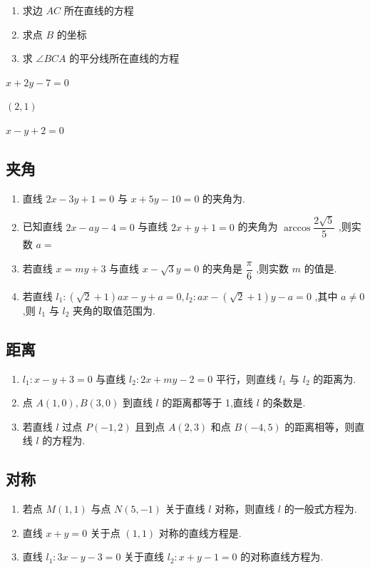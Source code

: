 \begin{enumerate}
\begin{enumerate}
        \item 求边 $AC$ 所在直线的方程
        \item 求点 $B$ 的坐标
        \item 求 $\angle BCA$ 的平分线所在直线的方程
    \end{enumerate}
    \begin{jieda}
        \begin{enumerate*}
            \item $x+2y-7 = 0$
            \item $(2,1)$
            \item $x-y+2=0$
        \end{enumerate*}
    \end{jieda}
\end{enumerate}
\subsection*{夹角}
\begin{enumerate}
    \item 直线 $2x - 3y + 1 = 0$ 与 $x + 5y - 10 = 0$ 的夹角为.
    \item 已知直线 $2x - ay - 4 = 0$ 与直线 $2x + y + 1 = 0$ 的夹角为 $\arccos \dfrac{2\sqrt{5}}{5}$ ,则实数 $a =$
    \item 若直线 $x = my + 3$ 与直线 $x - \sqrt{3}y = 0$ 的夹角是 $\dfrac{\pi}{6}$ ,则实数 $m$ 的值是.
    \item 若直线 $l_1 : \left( \sqrt{2} + 1\right) ax - y + a = 0,l_2 : ax - \left( \sqrt{2} + 1\right) y - a = 0$ ,其中 $a \neq 0$ ,则 $l_1$ 与 $l_2$ 夹角的取值范围为\blkda{$\left(0, \dfrac{\pi}{4}\right]$}.
\end{enumerate}
\subsection*{距离}
\begin{enumerate}
    \item $l_1 : x - y + 3 = 0$ 与直线 $l_2 : 2x + my - 2 = 0$ 平行，则直线 $l_1$ 与 $l_2$ 的距离为.
    \item 点 $A(1,0) ,B(3,0)$ 到直线 $l$ 的距离都等于 1,直线 $l$ 的条数是.
    \item 若直线 $l$ 过点 $P(-1,2)$ 且到点 $A(2,3)$ 和点 $B(-4,5)$ 的距离相等，则直线 $l$ 的方程为.
\end{enumerate}
\subsection*{对称}
\begin{enumerate}
    \item 若点 $M(1,1)$ 与点 $N(5, - 1)$ 关于直线 $l$ 对称，则直线 $l$ 的一般式方程为.
    \item 直线 $x + y = 0$ 关于点 $(1,1)$ 对称的直线方程是.
    \item 直线 $l_1 : 3x - y - 3 = 0$ 关于直线 $l_2 : x + y - 1 = 0$ 的对称直线方程为.
\end{enumerate}
